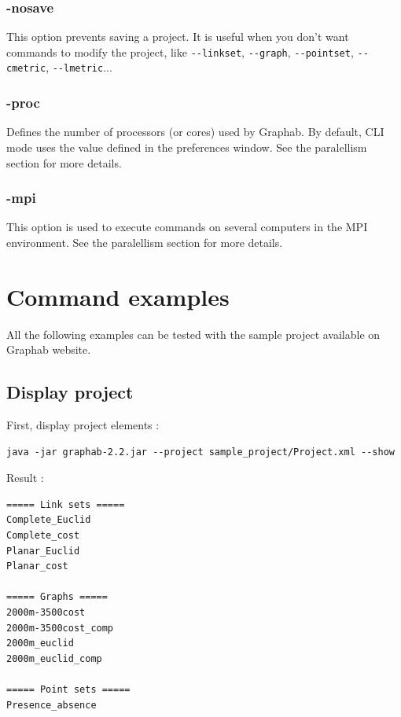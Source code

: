 \documentclass[a4paper,10pt]{report}
\begin{document}
\subsection{-nosave}
This option prevents saving a project. It is useful when you don't want commands to modify the project, 
like \verb|--linkset|, \verb|--graph|, \verb|--pointset|, \verb|--cmetric|, \verb|--lmetric|...

\subsection{-proc}
Defines the number of processors (or cores) used by Graphab.
By default, CLI mode uses the value defined in the preferences window.
See the paralellism section for more details.

\subsection{-mpi}
This option is used to execute commands on several computers in the MPI environment.
See the paralellism section for more details.

\chapter{Command examples}
All the following examples can be tested with the sample project available on Graphab website. 

\section{Display project}
First, display project elements :
\begin{Verbatim}
java -jar graphab-2.2.jar --project sample_project/Project.xml --show
\end{Verbatim}
Result :
\begin{Verbatim}
===== Link sets =====
Complete_Euclid
Complete_cost
Planar_Euclid
Planar_cost

===== Graphs =====
2000m-3500cost
2000m-3500cost_comp
2000m_euclid
2000m_euclid_comp

===== Point sets =====
Presence_absence
\end{Verbatim}
\end{document}
